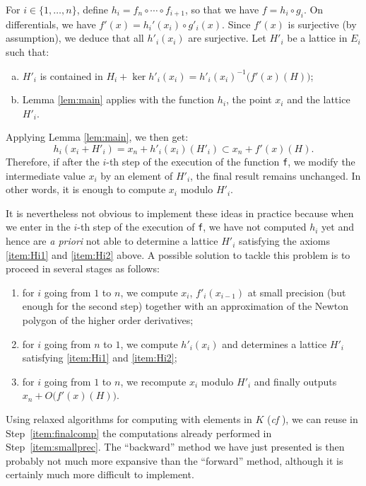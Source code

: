 \documentclass{lms}
\begin{document}
For $i \in \{1, \ldots, n\}$, define $h_i = f_n \circ \cdots \circ 
f_{i+1}$, so that we have $f = h_i \circ g_i$. On differentials, we 
have $f'(x) = h_i'(x_i) \circ g'_i(x)$. Since $f'(x)$ is surjective (by 
assumption), we deduce that all $h'_i(x_i)$ are surjective. Let $H'_i$ 
be a lattice in $E_i$ such that:
\begin{enumerate}[(a)] 
\item \label{item:Hi1}
$H'_i$ is contained in $H_i + \ker h'_i(x_i) = h'_i(x_i)^{-1}
\big(f'(x)(H)\big)$;
\item \label{item:Hi2}
Lemma \ref{lem:main} applies with the function $h_i$, the point
$x_i$ and the lattice $H'_i$.
\end{enumerate}
Applying Lemma \ref{lem:main}, we then get:
$$h_i(x_i + H'_i) = x_n + h'_i(x_i)(H'_i) \subset x_n + f'(x)(H).$$
Therefore, if after the $i$-th step of the execution of the function
{\tt f}, we modify the intermediate value $x_i$ by an element of
$H'_i$, the final result remains unchanged. In other words, it is
enough to compute $x_i$ modulo $H'_i$.

It is nevertheless not obvious to implement these ideas in practice
because when we enter in the $i$-th step of the execution of {\tt f},
we have not computed $h_i$ yet and hence are \emph{a priori} not able
to determine a lattice $H'_i$ satisfying the axioms \eqref{item:Hi1}
and \eqref{item:Hi2} above.
A possible solution to tackle this problem is to proceed in several
stages as follows: 
\begin{enumerate}[(1)]
\item \label{item:smallprec}
for $i$ going from $1$ to $n$, we compute $x_i$, $f'_i(x_{i-1})$ 
at small precision (but enough for the second step) together with an
approximation of the Newton polygon of the higher order derivatives;
\item \label{item:determineHi}
for $i$ going from $n$ to $1$, we compute $h'_i(x_i)$ and
determines a lattice $H'_i$ satisfying \eqref{item:Hi1} and 
\eqref{item:Hi2};
\item \label{item:finalcomp}
for $i$ going from $1$ to $n$, we recompute $x_i$ modulo $H'_i$
and finally outputs $x_n + O\big(f'(x)(H)\big)$.
\end{enumerate}
Using relaxed algorithms for computing with elements in $K$ (\emph{cf} 
\cite{}), we can reuse in Step~\eqref{item:finalcomp} the computations 
already performed in Step~\eqref{item:smallprec}. The ``backward'' method 
we have just presented is then probably not much more expansive than the 
``forward'' method, although it is certainly much more difficult to 
implement. 
\end{document}
